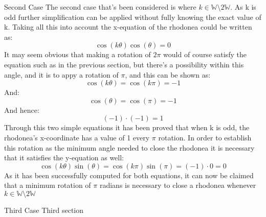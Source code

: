\documentclass[12pt, a4paper]{article}
\begin{document}
\begin{section}{Second Case}
The second case that's been considered is where $k \in \mathbb{W}\setminus2\mathbb{W}$. As k is odd further simplification can be applied without fully knowing the exact value of k. Taking all this into account the x-equation of the rhodonea could be written as:
\begin{equation}
 \cos(k\theta)\cos(\theta) = 0
\end{equation}
It may seem obvious that making a rotation of $2\pi$ would of course satisfy the equation such as in the previous section, but there's a possibility within this angle, and it is to appy a rotation of $\pi$, and this can be shown as:
\begin{equation*}
 \cos(k\theta) = \cos(k\pi) = -1
\end{equation*}
And:
\begin{equation*}
 \cos(\theta) = \cos(\pi) = -1
\end{equation*}
And hence:
\begin{equation*}
 (-1) \cdot (-1) = 1
\end{equation*}
Through this two simple equations it has been proved that when k is odd, the rhodonea's x-coordinate has a value of 1 every $\pi$ rotation. In order to establish this rotation as the minimum angle needed to close the rhodonea it is necessary that it satisfies the y-equation as well: 
\begin{equation}
  \cos(k\theta)\sin(\theta) = \cos(k\pi)\sin(\pi) = (-1)\cdot 0 = 0
\end{equation}
As it has been successfully computed for both equations, it can now be claimed that a minimum rotation of $\pi$ radians is necessary to close a rhodonea whenever $k \in \mathbb{W}\setminus 2 \mathbb{W}$
\end{section}
\begin{section}{Third Case}
Third section
\end{section}
\end{document}
